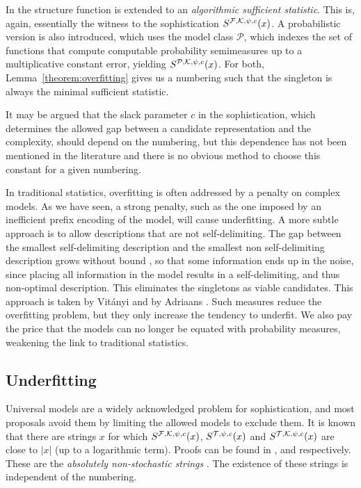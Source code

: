 In \cite{gacs2001algorithmic} the structure function is extended to an \emph{algorithmic sufficient statistic}. This is, again, essentially the witness to the sophistication $S^{{\cal F},{\cal K},\psi,c}(x)$. A probabilistic version is also introduced, which uses the model class $\mathcal P$, which indexes the set of functions that compute computable probability semimeasures up to a multiplicative constant error, yielding $S^{{\mathcal P}, {\cal K}, \psi, c}(x)$. For both, Lemma~\ref{theorem:overfitting} gives us a numbering such that the singleton is always the minimal sufficient statistic.

It may be argued that the slack parameter $c$ in the sophistication, which determines the allowed gap between a candidate representation and the complexity, should depend on the numbering, but this dependence has not been mentioned in the literature and there is no obvious method to choose this constant for a given numbering. 

In traditional statistics, overfitting is often addressed by a penalty on complex models. As we have seen, a strong penalty, such as the one imposed by an inefficient prefix encoding of the model, will cause underfitting. A more subtle approach is to allow descriptions that are not self-delimiting. The gap between the smallest self-delimiting description and the smallest non self-delimiting description grows without bound 
\cite[Section~4.5.5]{li1993introduction}, so that some information ends up in the noise, since placing all information in the model results in a self-delimiting, and thus non-optimal description. This eliminates the singletons as viable candidates. This approach is taken by Vit\'anyi \cite{vitanyi2004meaningful} and by Adriaans \cite{adriaans2012facticity}. Such measures reduce the overfitting problem, but they only increase the tendency to underfit. We also pay the price that the models can no longer be equated with probability measures, weakening the link to traditional statistics.

\subsection{Underfitting}
\label{section:underfitting}

Universal models are a widely acknowledged problem for sophistication, and most proposals avoid them by limiting the allowed models to exclude them. It is known that there are strings $x$ for which $S^{{\cal F}, {\cal K}, \psi, c}(x)$, $S^{{\cal T}, \psi, c}(x)$ and $S^{{\cal T}, {\cal K}, \psi, c}(x)$ are close to $|x|$ (up to a logarithmic term). Proofs can be found in \cite{gacs2001algorithmic}, \cite{antunes2009sophistication} and \cite{vitanyi2004meaningful} respectively. These are the \emph{absolutely non-stochastic strings} \cite{shen1983concept}. The existence of these strings is independent of the numbering. 

